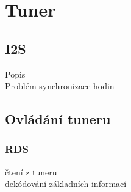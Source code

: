 \section{Tuner}
\label{sec:tuner}


\subsection{I2S}
	Popis\\
	Problém synchronizace hodin
	
	
\subsection{Ovládání tuneru}
\subsubsection{RDS}
		čtení z tuneru\\
		dekódování základních informací
